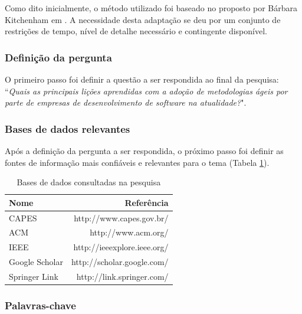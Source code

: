 Como dito inicialmente, o método utilizado foi baseado no proposto por Bárbara Kitchenham em \cite{Barbara04}. A necessidade desta adaptação se deu por um conjunto de restrições de tempo, nível de detalhe necessário e contingente disponível.

\subsubsection{Definição da pergunta}

O primeiro passo foi definir a questão a ser respondida ao final da pesquisa: ``\textit{Quais as principais lições aprendidas com a adoção de metodologias ágeis por parte de empresas de desenvolvimento de software na atualidade?}".

\subsubsection{Bases de dados relevantes}

Após a definição da pergunta a ser respondida, o próximo passo foi definir as fontes de informação mais confiáveis e relevantes para o tema (Tabela \ref{tab:basesDeDados}).

\begin{table}[H]
	\centering
	\begin{tabular}{| l | r |} \hline \textbf{Nome} & \textbf{Referência} \\ \hline
		CAPES & http://www.capes.gov.br/ \\ \hline
		ACM & http://www.acm.org/ \\ \hline
		IEEE & http://ieeexplore.ieee.org/ \\ \hline
		Google Scholar & http://scholar.google.com/ \\ \hline
		Springer Link & http://link.springer.com/ \\ \hline
	\end{tabular}
	\caption{Bases de dados consultadas na pesquisa}
	\label{tab:basesDeDados}
\end{table}

%
%
%

\subsubsection{Palavras-chave}


